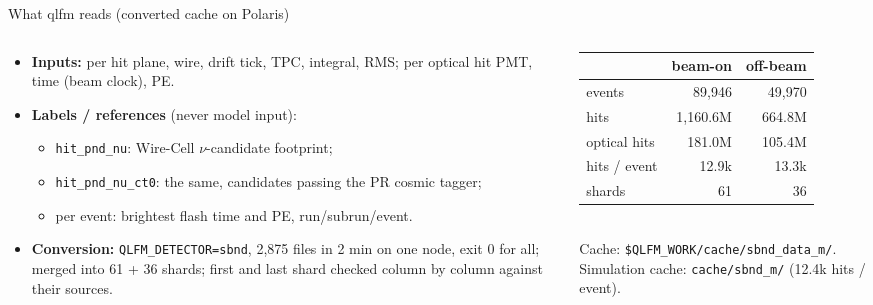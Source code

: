 \documentclass[aspectratio=169,10pt]{beamer}
\newcommand{\code}[1]{\texttt{#1}}
\begin{document}
\begin{frame}{What qlfm reads (converted cache on Polaris)}
  \footnotesize
  \begin{columns}[T]
    \begin{column}{0.52\textwidth}
      \begin{itemize}\setlength{\itemsep}{3pt}
        \item \textbf{Inputs:} per hit plane, wire, drift tick, TPC, integral, RMS; per optical hit PMT, time (beam clock), PE.
        \item \textbf{Labels / references} (never model input):
          \begin{itemize}
            \item \code{hit\_pnd\_nu}: Wire-Cell $\nu$-candidate footprint;
            \item \code{hit\_pnd\_nu\_ct0}: the same, candidates passing the PR cosmic tagger;
            \item per event: brightest flash time and PE, run/subrun/event.
          \end{itemize}
        \item \textbf{Conversion:} \code{QLFM\_DETECTOR=sbnd}, 2,875 files in 2 min on one node, exit 0 for all; merged into
          61 + 36 shards; first and last shard checked column by column against their sources.
      \end{itemize}
    \end{column}
    \begin{column}{0.46\textwidth}
      \centering
      \scriptsize
      \begin{tabular}{lrr}
        \toprule
        & beam-on & off-beam \\
        \midrule
        events & 89,946 & 49,970 \\
        hits & 1,160.6M & 664.8M \\
        optical hits & 181.0M & 105.4M \\
        hits / event & 12.9k & 13.3k \\
        shards & 61 & 36 \\
        \bottomrule
      \end{tabular}\\[4pt]
      {\tiny Cache: \code{\$QLFM\_WORK/cache/sbnd\_data\_m/}. Simulation cache: \code{cache/sbnd\_m/} (12.4k hits / event).}
    \end{column}
  \end{columns}
\end{frame}
\end{document}
